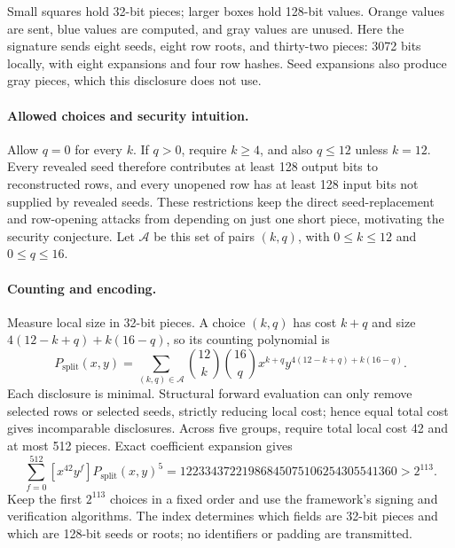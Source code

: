 \documentclass[10pt]{article}
\begin{document}
\begin{center}
\end{center}

Small squares hold 32-bit pieces; larger boxes hold 128-bit values. Orange values are sent, blue values are computed, and gray values are unused. Here the signature sends eight seeds, eight row roots, and thirty-two pieces: 3072 bits locally, with eight expansions and four row hashes. Seed expansions also produce gray pieces, which this disclosure does not use.

\paragraph{Allowed choices and security intuition.} Allow $q=0$ for every $k$. If $q>0$, require $k\ge4$, and also $q\le12$ unless $k=12$. Every revealed seed therefore contributes at least 128 output bits to reconstructed rows, and every unopened row has at least 128 input bits not supplied by revealed seeds. These restrictions keep the direct seed-replacement and row-opening attacks from depending on just one short piece, motivating the security conjecture. Let $\mathcal A$ be this set of pairs $(k,q)$, with $0\le k\le12$ and $0\le q\le16$.

\paragraph{Counting and encoding.} Measure local size in 32-bit pieces. A choice $(k,q)$ has cost $k+q$ and size $4(12-k+q)+k(16-q)$, so its counting polynomial is
\[
 P_{\mathrm{split}}(x,y)=\sum_{(k,q)\in\mathcal A}\binom{12}k\binom{16}q x^{k+q}y^{4(12-k+q)+k(16-q)}.
\]
Each disclosure is minimal. Structural forward evaluation can only remove selected rows or selected seeds, strictly reducing local cost; hence equal total cost gives incomparable disclosures. Across five groups, require total local cost 42 and at most 512 pieces. Exact coefficient expansion gives
\[
 \sum_{f=0}^{512}[x^{42}y^f]P_{\mathrm{split}}(x,y)^5=12233437221986845075106254305541360>2^{113}.
\]
Keep the first $2^{113}$ choices in a fixed order and use the framework's signing and verification algorithms. The index determines which fields are 32-bit pieces and which are 128-bit seeds or roots; no identifiers or padding are transmitted.
\end{document}

